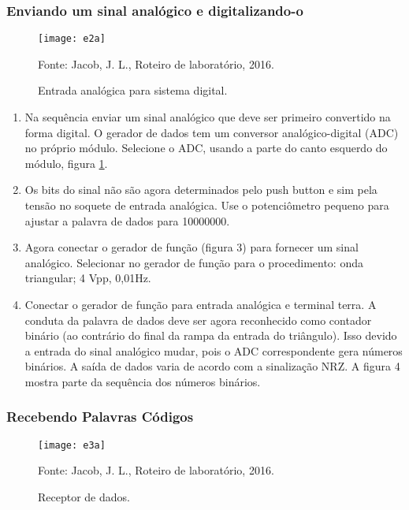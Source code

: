         
        \subsubsection{Enviando um sinal analógico e digitalizando-o}
            \begin{figure}[H]
                \centering
                \caption{Entrada analógica para sistema digital.}
                \texttt{[image: e2a]}
                
                \small Fonte: Jacob, J. L., Roteiro de laboratório, 2016.
                \label{fig:e2a}
            \end{figure}
            
            \begin{enumerate}
                \item Na sequência enviar um sinal analógico que deve ser primeiro convertido na forma digital. O gerador de dados tem um conversor analógico-digital (ADC) no próprio módulo. Selecione o ADC, usando a parte do canto esquerdo do módulo, figura \ref{fig:e2a}.
                
                \item Os bits do sinal não são agora determinados pelo push button e sim pela tensão no soquete de entrada analógica. Use o potenciômetro pequeno para ajustar a palavra de dados para 10000000.
                
                \item Agora conectar o gerador de função (figura 3) para fornecer um sinal analógico. Selecionar no gerador de função para o procedimento: onda triangular; 4 Vpp, 0,01Hz.
                
                \item Conectar o gerador de função para entrada analógica e terminal terra. A conduta da palavra de dados deve ser agora reconhecido como contador binário (ao contrário do final da rampa da entrada do triângulo). Isso devido a entrada do sinal analógico mudar, pois o ADC correspondente gera números binários. A saída de dados varia de acordo com a sinalização NRZ. A figura 4 mostra parte da sequência dos números binários.
            \end{enumerate}
    
        \subsubsection{Recebendo Palavras Códigos}
             \begin{figure}[H]
                 \centering
                 \caption{Receptor de dados.}
                 \texttt{[image: e3a]}
                        
                 \small Fonte: Jacob, J. L., Roteiro de laboratório, 2016.
                 \label{fig:e3a}
             \end{figure}
                    

